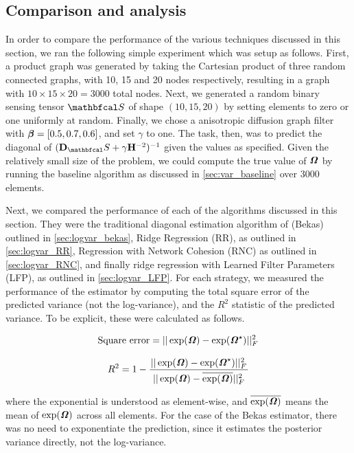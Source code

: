 \subsection{Comparison and analysis}

\label{sec:logvar_experiments} 

In order to compare the performance of the various techniques discussed in this section, we ran the following simple experiment which was setup as follows. First, a product graph was generated by taking the Cartesian product of three random connected graphs, with 10, 15 and 20 nodes respectively, resulting in a graph with $10 \times 15 \times 20 = 3000$ total nodes. Next, we generated a random binary sensing tensor $\St$ of shape $(10, 15, 20)$ by setting elements to zero or one uniformly at random. Finally, we chose a anisotropic diffusion graph filter with $\boldsymbol{\beta} = [0.5, 0.7, 0.6]$, and set $\gamma$ to one. The task, then, was to predict the diagonal of $(\D_\St + \gamma \HH^{-2})^{-1}$ given the values as specified. Given the relatively small size of the problem, we could compute the true value of $\bm{\mathit{\Omega}}$ by running the baseline algorithm as discussed in \cref{sec:var_baseline} over 3000 elements. 

Next, we compared the performance of each of the algorithms discussed in this section. They were the traditional diagonal estimation algorithm of \cite{Bekas2007} (Bekas) outlined in \cref{sec:logvar_bekas}, Ridge Regression (RR), as outlined in \cref{sec:logvar_RR}, Regression with Network Cohesion (RNC) as outlined in \cref{sec:logvar_RNC}, and finally ridge regression with Learned Filter Parameters (LFP), as outlined in \cref{sec:logvar_LFP}. For each strategy, we measured the performance of the estimator by computing the total square error of the predicted variance (not the log-variance), and the $R^2$ statistic of the predicted variance. To be explicit, these were calculated as follows. 

\begin{equation}
    \text{Square error} = || \exp(\bm{\mathit{\Omega}}) - \exp(\bm{\mathit{\Omega}}^\star)||_F^2
\end{equation}

\begin{equation}
    R^2 = 1 - \frac{|| \exp(\Omegat) - \exp(\Omegat^\star)||_F^2}{ \raisebox{-0.1cm} { $|| \exp(\Omegat) - \overline{\exp(\Omegat)}||_F^2$ }}
\end{equation}

where the exponential is understood as element-wise, and $\overline{\exp(\bm{\mathit{\Omega}})}$ means the mean of $\exp(\bm{\mathit{\Omega}})$ across all elements. For the case of the Bekas estimator, there was no need to exponentiate the prediction, since it estimates the posterior variance directly, not the log-variance. 

